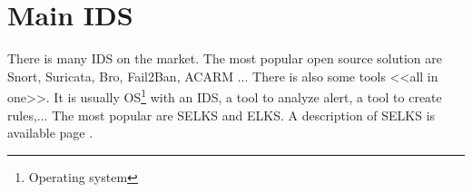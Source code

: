 

\section{Main IDS}

There is many IDS on the market. The most popular open source solution are Snort, Suricata, Bro, Fail2Ban, ACARM
... There is also some tools <<all in one>>. It is usually OS\footnote{Operating system} with an IDS, a tool to
analyze alert, a tool to create rules,... The most popular are SELKS and ELKS. A description of SELKS is available
page \pageref{chap:selks}.




